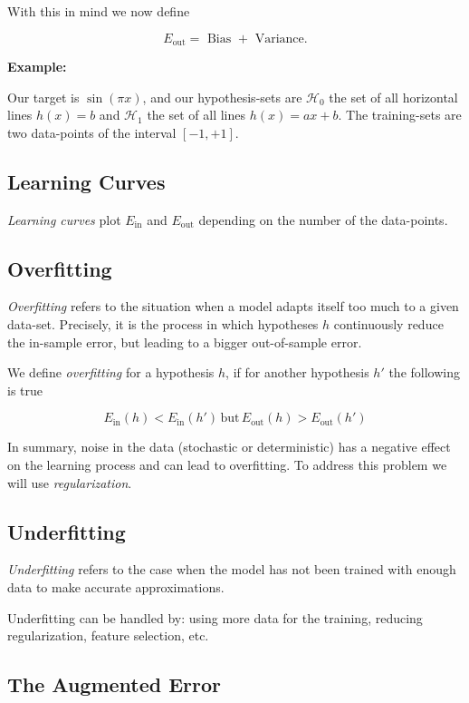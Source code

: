 With this in mind we now define

\[
	E_{\text{out}} = \text{ Bias } + \text{ Variance}.
\]

\textbf{Example:}

Our target is \(\sin(\pi x)\), and our hypothesis-sets are \(\mathcal{H}_0\) the set of all horizontal
lines \(h(x) = b\) and \(\mathcal{H}_1\) the set of all lines \(h(x) = ax + b\). The training-sets are two data-points of the interval
\([-1,+1]\).

\subsection{Learning Curves}

\emph{Learning curves} plot \(E_{\text{in}}\) and \(E_{\text{out}}\) depending on the number of the
data-points.

\subsection{Overfitting}

\emph{Overfitting} refers to the situation when a model adapts itself too much to a given data-set. Precisely, it is the process
in which hypotheses \(h\) continuously reduce the in-sample error, but leading to a bigger out-of-sample error.

We define \emph{overfitting} for a hypothesis \(h\), if for another hypothesis \(h'\) the following is true

\[
	E_{\text{in}}(h) < E_{\text{in}}(h') \, \text{but} \, E_{\text{out}}(h) > E_{\text{out}}(h')
\]

In summary, noise in the data (stochastic or deterministic) has a negative effect on the learning process and can lead
to overfitting. To address this problem we will use \emph{regularization}.

\subsection{Underfitting}

\emph{Underfitting} refers to the case when the model has not been trained with enough data to make
accurate approximations.

Underfitting can be handled by: using more data for the training, reducing regularization, feature selection, etc.

\subsection{The Augmented Error}

